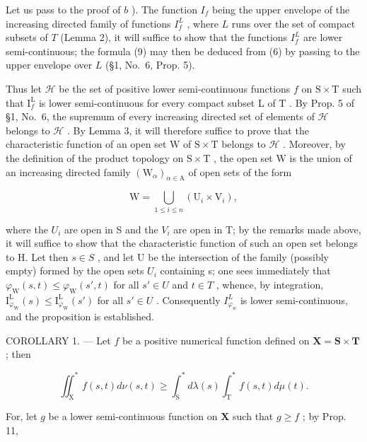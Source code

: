Let us pass to the proof of \(b\) ). The function \(I_f\) being the upper envelope of the increasing directed family of functions \(I_f^L\) , where \(L\) runs over the set of compact subsets of \(T\) (Lemma 2), it will suffice to show that the functions \(I_f^L\) are lower semi-continuous; the formula (9) may then be deduced from (6) by passing to the upper envelope over \(L\) (§1, No.~6, Prop. 5).

Thus let \(\mathcal{H}\) be the set of positive lower semi-continuous functions \(f\) on \(\mathrm{S} \times \mathrm{T}\) such that \(\mathrm{I}_f^{\mathrm{L}}\) is lower semi-continuous for every compact subset \(\mathrm{L}\) of \(\mathrm{T}\) . By Prop. 5 of §1, No.~6, the supremum of every increasing directed set of elements of \(\mathcal{H}\) belongs to \(\mathcal{H}\) . By Lemma 3, it will therefore suffice to prove that the characteristic function of an open set \(\mathrm{W}\) of \(\mathrm{S} \times \mathrm{T}\) belongs to \(\mathcal{H}\) . Moreover, by the definition of the product topology on \(\mathrm{S} \times \mathrm{T}\) , the open set \(\mathrm{W}\) is the union of an increasing directed family \((\mathrm{W}_{\alpha})_{\alpha \in \mathrm{A}}\) of open sets of the form

\[
\mathrm{W} = \bigcup_ {1 \leqslant i \leqslant n} \left(\mathrm{U} _ {i} \times \mathrm{V} _ {i}\right),
\]

where the \(U_{i}\) are open in S and the \(V_{i}\) are open in T; by the remarks made above, it will suffice to show that the characteristic function of such an open set belongs to H. Let then \(s \in S\) , and let U be the intersection of the family (possibly empty) formed by the open sets \(U_{i}\) containing s; one sees immediately that \(\varphi_{\mathrm{W}}(s,t) \leqslant \varphi_{\mathrm{W}}(s',t)\) for all \(s' \in U\) and \(t \in T\) , whence, by integration, \(\mathrm{I}_{\varphi_{\mathrm{W}}}^{\mathrm{L}}(s) \leqslant \mathrm{I}_{\varphi_{\mathrm{W}}}^{\mathrm{L}}(s')\) for all \(s' \in U\) . Consequently \(I_{\varphi_{w}}^{L}\) is lower semi-continuous, and the proposition is established.

COROLLARY 1. --- Let \(f\) be a positive numerical function defined on \(\mathbf{X} = \mathbf{S} \times \mathbf{T}\) ; then

\[
\iint_ {\mathrm{X}} ^ {*} f (s, t) d \nu (s, t) \geqslant \int_ {\mathrm{S}} ^ {*} d \lambda (s) \int_ {\mathrm{T}} ^ {*} f (s, t) d \mu (t).\tag{10}
\]

For, let \(g\) be a lower semi-continuous function on \(\mathbf{X}\) such that \(g \geqslant f\) ; by Prop. 11,

